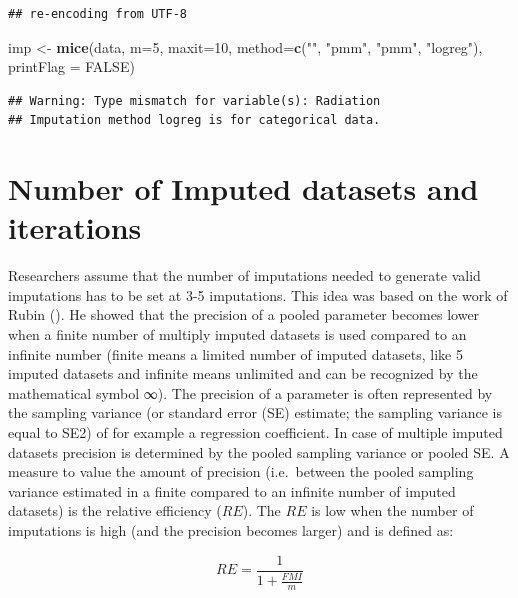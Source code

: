 \documentclass[
]{book}
\newenvironment{Shaded}{\begin{snugshade}}{\end{snugshade}}
\newcommand{\DataTypeTok}[1]{\textcolor[rgb]{0.13,0.29,0.53}{#1}}
\newcommand{\DecValTok}[1]{\textcolor[rgb]{0.00,0.00,0.81}{#1}}
\newcommand{\KeywordTok}[1]{\textcolor[rgb]{0.13,0.29,0.53}{\textbf{#1}}}
\newcommand{\NormalTok}[1]{#1}
\newcommand{\OtherTok}[1]{\textcolor[rgb]{0.56,0.35,0.01}{#1}}
\newcommand{\StringTok}[1]{\textcolor[rgb]{0.31,0.60,0.02}{#1}}
\begin{document}
\begin{verbatim}
## re-encoding from UTF-8
\end{verbatim}

\begin{Shaded}
\begin{Highlighting}[]
\NormalTok{imp <-}\StringTok{ }\KeywordTok{mice}\NormalTok{(data, }\DataTypeTok{m=}\DecValTok{5}\NormalTok{, }\DataTypeTok{maxit=}\DecValTok{10}\NormalTok{, }\DataTypeTok{method=}\KeywordTok{c}\NormalTok{(}\StringTok{""}\NormalTok{, }\StringTok{"pmm"}\NormalTok{, }\StringTok{"pmm"}\NormalTok{, }\StringTok{"logreg"}\NormalTok{), }\DataTypeTok{printFlag =} \OtherTok{FALSE}\NormalTok{)}
\end{Highlighting}
\end{Shaded}

\begin{verbatim}
## Warning: Type mismatch for variable(s): Radiation
## Imputation method logreg is for categorical data.
\end{verbatim}

\hypertarget{number-of-imputed-datasets-and-iterations}{%
\section{Number of Imputed datasets and iterations}\label{number-of-imputed-datasets-and-iterations}}

Researchers assume that the number of imputations needed to generate valid imputations has to be set at 3-5 imputations. This idea was based on the work of Rubin (\citet{Rubin1987}). He showed that the precision of a pooled parameter becomes lower when a finite number of multiply imputed datasets is used compared to an infinite number (finite means a limited number of imputed datasets, like 5 imputed datasets and infinite means unlimited and can be recognized by the mathematical symbol ∞). The precision of a parameter is often represented by the sampling variance (or standard error (SE) estimate; the sampling variance is equal to SE2) of for example a regression coefficient. In case of multiple imputed datasets precision is determined by the pooled sampling variance or pooled SE. A measure to value the amount of precision (i.e.~between the pooled sampling variance estimated in a finite compared to an infinite number of imputed datasets) is the relative efficiency (\(RE\)). The \(RE\) is low when the number of imputations is high (and the precision becomes larger) and is defined as:

\[RE=  \frac{1}{1+ \frac{FMI}{m}}\]
\end{document}
